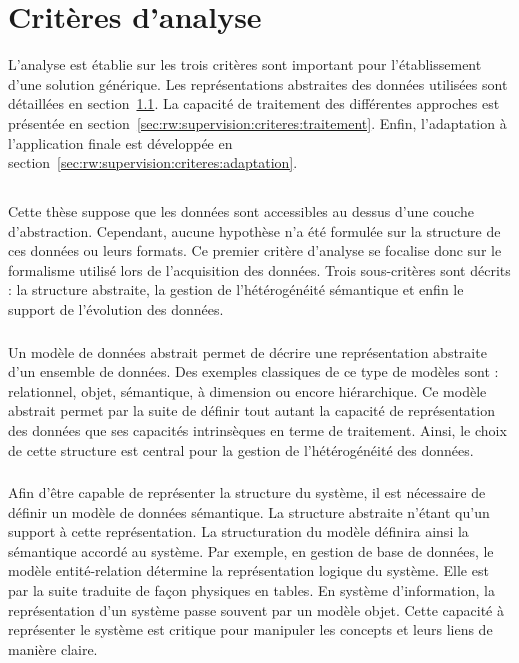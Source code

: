 \section{Critères d'analyse}\label{sec:rw:supervision:criteres}
L'analyse est établie sur les trois critères sont important pour l'établissement d'une solution générique. Les représentations abstraites des données utilisées sont détaillées en section~\ref{sec:rw:supervision:criteres:structure}. La capacité de traitement des différentes approches est présentée en section~\ref{sec:rw:supervision:criteres:traitement}. Enfin, l'adaptation à l'application finale est développée en section~\ref{sec:rw:supervision:criteres:adaptation}.

\subsection{\critereA}\label{sec:rw:supervision:criteres:structure}
Cette thèse suppose que les données sont accessibles au dessus d'une couche d'abstraction. Cependant, aucune hypothèse n'a été formulée sur la structure de ces données ou leurs formats. Ce premier critère d'analyse se focalise donc sur le formalisme utilisé lors de l'acquisition des données. Trois sous-critères sont décrits : la structure abstraite, la gestion de l'hétérogénéité sémantique et enfin le support de l'évolution des données.

\subsubsection{\critereAA}
Un modèle de données abstrait permet de décrire une représentation abstraite d'un ensemble de données. Des exemples classiques de ce type de modèles sont : relationnel, objet, sémantique, à dimension ou encore hiérarchique. Ce modèle abstrait permet par la suite de définir tout autant la capacité de représentation des données que ses capacités intrinsèques en terme de traitement. Ainsi, le choix de cette structure est central pour la gestion de l'hétérogénéité des données.

\subsubsection{\critereAB}
Afin d'être capable de représenter la structure du système, il est nécessaire de définir un modèle de données sémantique. La structure abstraite n'étant qu'un support à cette représentation. La structuration du modèle définira ainsi la sémantique accordé au système. Par exemple, en gestion de base de données, le modèle entité-relation détermine la représentation logique du système. Elle est par la suite traduite de façon physiques en tables. En système d'information, la représentation d'un système passe souvent par un modèle objet. Cette capacité à représenter le système est critique pour manipuler les concepts et leurs liens de manière claire.

